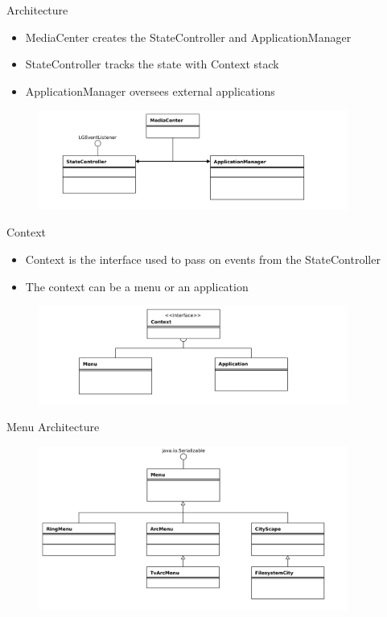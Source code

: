 \documentclass[style=smrt,mode=present,paper=screen]{powerdot}
\begin{document}
\begin{slide}{Architecture}
\begin{itemize}
\item MediaCenter creates the StateController and ApplicationManager
\item StateController tracks the state with Context stack
\item ApplicationManager oversees external applications
\end{itemize}
\begin{figure}
	\includegraphics[angle=-90,width=4in]{figures/MediaCenter-uml}
\end{figure}
\end{slide}

\begin{slide}{Context}
\begin{itemize}
\item Context is the interface used to pass on events from the StateController
\item The context can be a menu or an application
\end{itemize}
\begin{figure}[htb]
	\includegraphics[angle=-90,width=4in]{figures/Context-uml}
\end{figure}
\end{slide}

\begin{slide}{Menu Architecture}
\begin{figure}[htb]
	\includegraphics[angle=-90,width=4in]{figures/Menu-uml}
\end{figure}
\end{slide}
\end{document}
